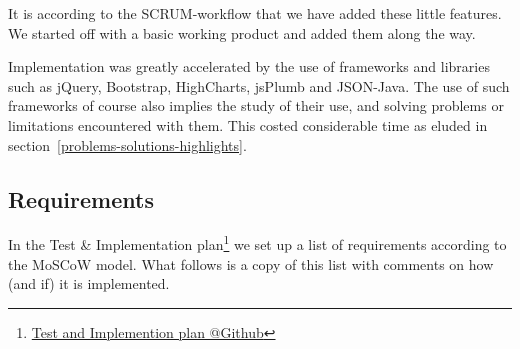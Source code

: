 \documentclass[a4paper]{article}
\makeatletter
\newcommand{\urlTestImplementation}{https://github.com/FelixAkk/synthbio/raw/master/deliverables/test-implementation/test-implementation.pdf}
\newcommand{\hrefTestImplementation}{\href{\urlTestImplementation}{Test and Implemention plan @Github}}
\makeatother
\begin{document}
It is according to the SCRUM-workflow that we have added these little features. We started off with a basic working product and added them along the way.

Implementation was greatly accelerated by the use of frameworks and libraries such as jQuery, Bootstrap, HighCharts, jsPlumb and JSON-Java. The use of such frameworks of course also implies the study of their use, and solving problems or limitations encountered with them. This costed considerable time as eluded in section~\ref{problems-solutions-highlights}.

\newpage
\subsection{Requirements}
\label{process-requirements}
In the Test \& Implementation plan\footnote{\hrefTestImplementation} we set up a list of requirements according to the MoSCoW model. What follows is a copy of this list with comments on how (and if) it is implemented.
\end{document}
